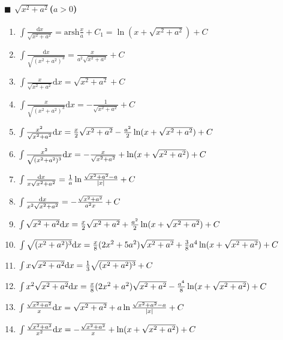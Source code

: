 \paragraph{$\blacksquare$ $\sqrt{x^2+a^2}$($a>0$)}

\begin{enumerate}

\item $ \int \frac{\mathrm{d}x}{\sqrt{x^2+a^2}} = \mathrm{arsh} \frac{x}{a} + C_1 = \ln(x + \sqrt{x^2+a^2}) + C$

\item $ \int \frac{\mathrm{d}x}{\sqrt{(x^2+a^2)^3}} = \frac{x}{a^2\sqrt{x^2+a^2}} + C $

\item $ \int \frac{x}{\sqrt{x^2+a^2}} \mathrm{d}x = \sqrt{x^2+a^2} + C $

\item $ \int \frac{x}{\sqrt{(x^2+a^2)^3}} \mathrm{d}x = -\frac{1}{\sqrt{x^2+a^2}} + C $

\item $ \int \frac{x^2}{\sqrt{x^2+a^2}} \mathrm{d} x = \frac{x}{2}\sqrt{x^2+a^2} - \frac{a^2}{2}\ln(x+\sqrt{x^2+a^2}) + C $

\item $ \int \frac{x^2}{\sqrt{(x^2+a^2)^3}} \mathrm{d} x = -\frac{x}{\sqrt{x^2+a^2}} + \ln(x+\sqrt{x^2+a^2}) + C $

\item $ \int \frac{\mathrm{d} x}{x\sqrt{x^2+a^2}} = \frac{1}{a} \ln \frac{\sqrt{x^2+a^2}-a}{|x|} + C $

\item $ \int \frac{\mathrm{d} x}{x^2\sqrt{x^2+a^2}} = -\frac{\sqrt{x^2+a^2}}{a^2x} + C $

\item $ \int \sqrt{x^2+a^2} \mathrm{d} x = \frac{x}{2}\sqrt{x^2+a^2}+\frac{a^2}{2}\ln(x + \sqrt{x^2+a^2}) + C $

\item $ \int \sqrt{(x^2+a^2)^3} \mathrm{d} x = \frac{x}{8}(2x^2+5a^2)\sqrt{x^2+a^2} + \frac{3}{8}a^4\ln(x + \sqrt{x^2+a^2}) + C $

\item $ \int x \sqrt{x^2+a^2} \mathrm{d} x = \frac{1}{3} \sqrt{(x^2+a^2)^3} + C $

\item $ \int x^2\sqrt{x^2+a^2} \mathrm{d} x = \frac{x}{8}(2x^2+a^2)\sqrt{x^2+a^2} - \frac{a^4}{8}\ln(x+\sqrt{x^2+a^2}) + C $

\item $ \int \frac{\sqrt{x^2+a^2}}{x} \mathrm{d} x = \sqrt{x^2+a^2} + a \ln \frac{\sqrt{x^2+a^2}-a}{|x|} + C $

\item $ \int \frac{\sqrt{x^2+a^2}}{x^2} \mathrm{d} x = -\frac{\sqrt{x^2+a^2}}{x} + \ln(x + \sqrt{x^2+a^2}) + C $

\end{enumerate}

